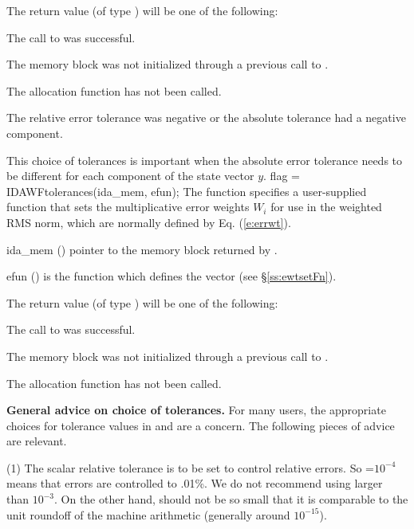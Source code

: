 {
  The return value  (of type ) will be one of the following:
  \begin{args}
  \item[\Id{IDA\_SUCCESS}]
    The call to  was successful.
  \item[\Id{IDA\_MEM\_NULL}]
    The {\idas} memory block was not initialized through a previous call to
    .
  \item[\Id{IDA\_NO\_MALLOC}]
    The allocation function  has not been called.
  \item[\Id{IDA\_ILL\_INPUT}]
    The relative error tolerance was negative or the absolute tolerance
    had a negative component.
  \end{args}
}
{
  This choice of tolerances is important when the absolute error tolerance needs to
  be different for each component of the state vector $y$.
}
{
  flag = IDAWFtolerances(ida\_mem, efun);
}
{
  The function  specifies a user-supplied function 
  that sets the multiplicative error weights $W_i$ for use in the weighted
  RMS norm, which are normally defined by Eq. (\ref{e:errwt}).
}
{
  \begin{args}
  \item[ida\_mem] ()
    pointer to the {\idas} memory block returned by .
  \item[efun] ()
    is the {\CC} function which defines the  vector (see
    \S\ref{ss:ewtsetFn}).
  \end{args}
}
{
  The return value  (of type ) will be one of the following:
  \begin{args}
  \item[\Id{IDA\_SUCCESS}]
    The call to  was successful.
  \item[\Id{IDA\_MEM\_NULL}]
    The {\idas} memory block was not initialized through a previous call to
    .
  \item[\Id{IDA\_NO\_MALLOC}]
    The allocation function  has not been called.
  \end{args}
}
{}

{\bf General advice on choice of tolerances.}
For many users, the appropriate choices for tolerance values in
 and  are a concern.  The following pieces of
advice are relevant.

(1) The scalar relative tolerance  is to be set to control relative
errors.  So =$10^{-4}$ means that errors are controlled to .01\%.  We
do not recommend using  larger than $10^{-3}$.  On the other hand,
 should not be so small that it is comparable to the unit roundoff
of the machine arithmetic (generally around $10^{-15}$).

